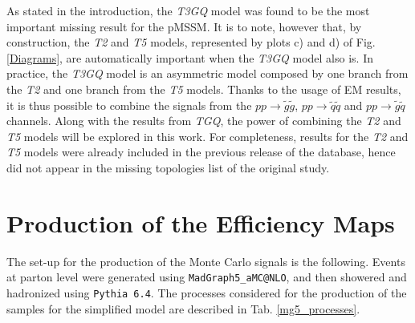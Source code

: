 \documentclass[a4paper,11pt]{article}
\begin{document}
%
As stated in the introduction, the \textit{T3GQ} model was found to be the most important missing result for the pMSSM. It is to note, however that, by construction, the \textit{T2} and \textit{T5} models, represented by plots c) and d) of Fig. \ref{Diagrams}, are automatically important when the \textit{T3GQ} model also is. In practice, the \textit{T3GQ} model is an asymmetric model composed by one branch from the \textit{T2} and one branch from the \textit{T5} models. Thanks to the usage of EM results, it is thus possible to combine the signals from the $pp \rightarrow \tilde g \tilde g$, $pp \rightarrow \tilde q \tilde q$ and $pp \rightarrow \tilde g \tilde q$ channels. Along with the results from \textit{TGQ}, the power of combining the \textit{T2} and \textit{T5} models will be explored in this work. For completeness, results for the \textit{T2} and \textit{T5} models were already included in the previous release of the database, hence did not appear in the missing topologies list of the original study. 
\section{Production of the Efficiency Maps}\label{EMprod}
The set-up for the production of the Monte Carlo signals is the following. Events at parton level were generated using \texttt{MadGraph5\_aMC@NLO}\cite{Alwall:2011uj}, and then showered and hadronized using \texttt{Pythia 6.4}\cite{Sjostrand:2006za}. The processes considered for the production of the samples for the simplified model are described in Tab. \ref{mg5_processes}.
\end{document}
